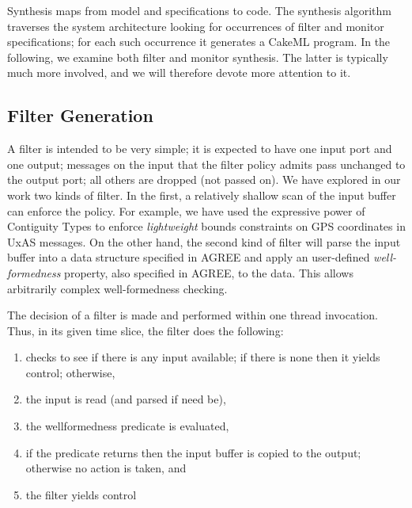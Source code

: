 Synthesis maps from model and specifications to code. The synthesis
algorithm traverses the system architecture looking for occurrences of
filter and monitor specifications;  for each such occurrence it
generates a CakeML program. In the following, we examine both filter
and monitor synthesis. The latter is typically much more involved, and
we will therefore devote more attention to it.

\subsection{Filter Generation}

A filter is intended to be very simple; it is expected to have one
input port and one output; messages on the input that the filter
policy admits pass unchanged to the output port; all others are
dropped (not passed on). We have explored in our work two kinds of
filter. In the first, a relatively shallow scan of the input buffer
can enforce the policy. For example, we have used the expressive power
of Contiguity Types \cite{contiguity-types} to enforce
\emph{lightweight} bounds constraints on GPS coordinates in UxAS
messages. On the other hand, the second kind of filter will parse the
input buffer into a data structure specified in AGREE and apply an
user-defined \emph{well-formedness} property, also specified in AGREE,
to the data. This allows arbitrarily complex well-formedness checking.

The decision of a filter is made and performed within one thread
invocation. Thus, in its given time slice, the filter does the following:

\begin{enumerate}

\item checks to see if there is any input available; if there is none
then it yields control; otherwise,

\item the input is read (and parsed if need be),

\item the wellformedness predicate is evaluated,

\item if the predicate returns  then the input buffer
 is copied to the output; otherwise no action is taken, and

\item the filter yields control
\end{enumerate}

